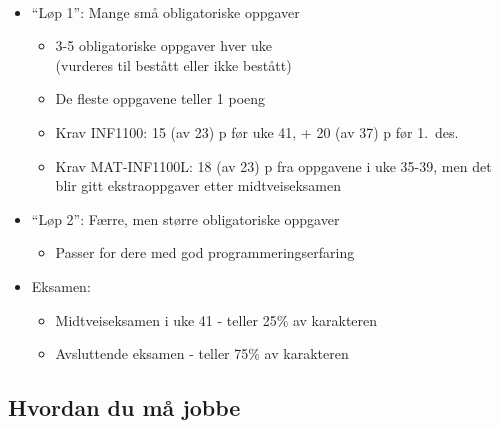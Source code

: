 \documentclass[%
oneside,                 %
final,                   %
10pt]{article}
\begin{document}
\paragraph{}
\begin{itemize}
  \item ``Løp 1'': Mange små obligatoriske oppgaver
\begin{itemize}

    \item 3-5 obligatoriske oppgaver hver uke\\
      (vurderes til bestått eller ikke bestått)

    \item De fleste oppgavene teller 1 poeng

    \item Krav INF1100: 15 (av 23) p før uke 41, + 20 (av 37) p før 1.~des.

    \item Krav MAT-INF1100L: 18 (av 23) p fra oppgavene i uke 35-39, men det blir gitt
      ekstraoppgaver etter midtveiseksamen

\end{itemize}

\noindent
  \item ``Løp 2'': Færre, men større obligatoriske oppgaver
\begin{itemize}

    \item Passer for dere med god programmeringserfaring

\end{itemize}

\noindent
  \item Eksamen:
\begin{itemize}

    \item Midtveiseksamen i uke 41 - teller 25\% av karakteren

    \item Avsluttende eksamen - teller 75\% av karakteren
\end{itemize}

\noindent
\end{itemize}

\noindent



\subsection*{Hvordan du må jobbe}
\end{document}
